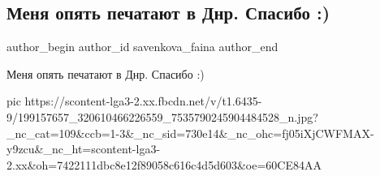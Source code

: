  
 
 
 
 
 
\subsection{Меня опять печатают в Днр. Спасибо :)}
\label{sec:13_06_2021.fb.savenkova_faina.1.donbass_publikacia_spasibo}
\ifcmt
 author_begin
   author_id savenkova_faina
 author_end
\fi

Меня опять печатают в Днр. Спасибо :) 

\ifcmt
  pic https://scontent-lga3-2.xx.fbcdn.net/v/t1.6435-9/199157657_320610466226559_7535790245904484528_n.jpg?_nc_cat=109&ccb=1-3&_nc_sid=730e14&_nc_ohc=fj05iXjCWFMAX-y9zcu&_nc_ht=scontent-lga3-2.xx&oh=7422111dbc8e12f89058c616c4d5d603&oe=60CE84AA
\fi

